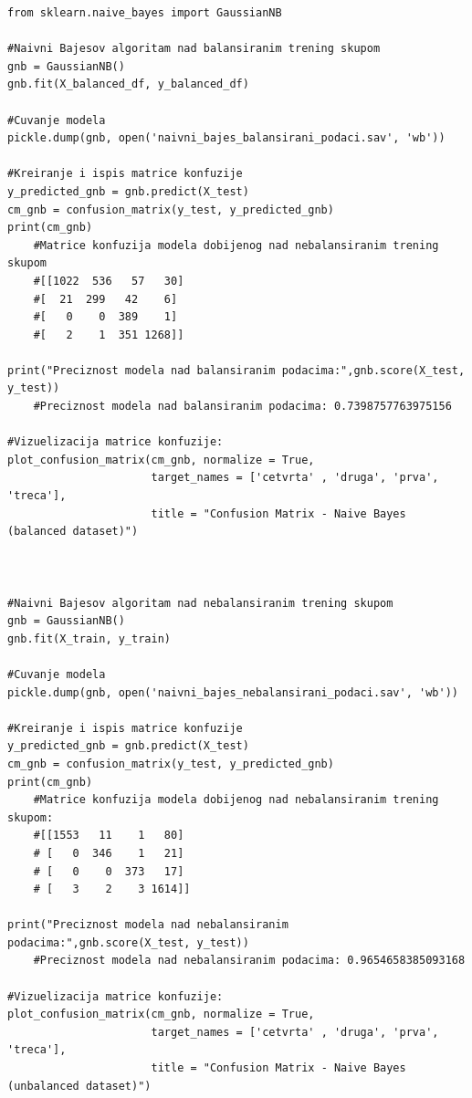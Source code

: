 \documentclass[a4paper]{article}
\begin{document}
\begin{lstlisting}[caption={Kreiranje modela Naivnim Bajesovim algoritmom nad balansiranim i nebalansiranim trening podacima},frame=single, label=nbm]
from sklearn.naive_bayes import GaussianNB

#Naivni Bajesov algoritam nad balansiranim trening skupom
gnb = GaussianNB()
gnb.fit(X_balanced_df, y_balanced_df)

#Cuvanje modela
pickle.dump(gnb, open('naivni_bajes_balansirani_podaci.sav', 'wb'))

#Kreiranje i ispis matrice konfuzije
y_predicted_gnb = gnb.predict(X_test)
cm_gnb = confusion_matrix(y_test, y_predicted_gnb)
print(cm_gnb)
	#Matrice konfuzija modela dobijenog nad nebalansiranim trening skupom
	#[[1022  536   57   30]
	#[  21  299   42    6]
	#[   0    0  389    1]
	#[   2    1  351 1268]]

print("Preciznost modela nad balansiranim podacima:",gnb.score(X_test, y_test))
	#Preciznost modela nad balansiranim podacima: 0.7398757763975156

#Vizuelizacija matrice konfuzije:
plot_confusion_matrix(cm_gnb, normalize = True,
                      target_names = ['cetvrta' , 'druga', 'prva', 'treca'],
                      title = "Confusion Matrix - Naive Bayes (balanced dataset)")


    
#Naivni Bajesov algoritam nad nebalansiranim trening skupom
gnb = GaussianNB()
gnb.fit(X_train, y_train)

#Cuvanje modela
pickle.dump(gnb, open('naivni_bajes_nebalansirani_podaci.sav', 'wb'))

#Kreiranje i ispis matrice konfuzije
y_predicted_gnb = gnb.predict(X_test)
cm_gnb = confusion_matrix(y_test, y_predicted_gnb)
print(cm_gnb)
	#Matrice konfuzija modela dobijenog nad nebalansiranim trening skupom:
	#[[1553   11    1   80]
	# [   0  346    1   21]
	# [   0    0  373   17]
	# [   3    2    3 1614]]

print("Preciznost modela nad nebalansiranim podacima:",gnb.score(X_test, y_test))
	#Preciznost modela nad nebalansiranim podacima: 0.9654658385093168

#Vizuelizacija matrice konfuzije:
plot_confusion_matrix(cm_gnb, normalize = True,
                      target_names = ['cetvrta' , 'druga', 'prva', 'treca'],
                      title = "Confusion Matrix - Naive Bayes (unbalanced dataset)")

\end{lstlisting}
\end{document}

